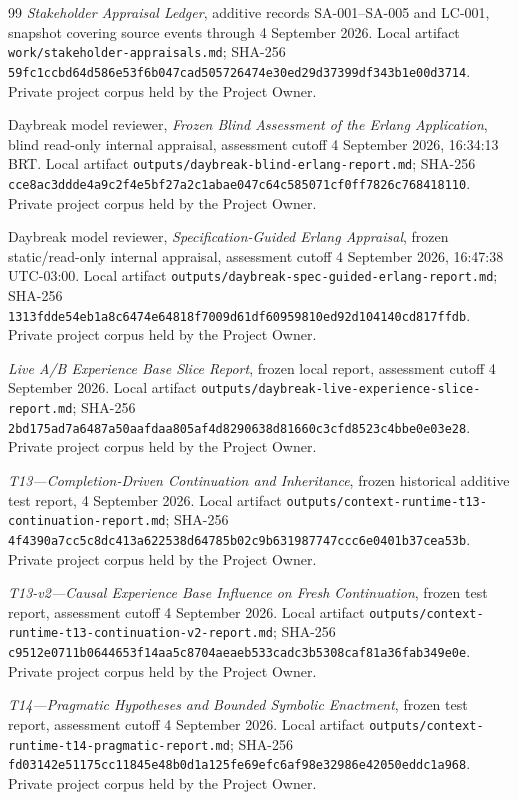 \documentclass[10pt,a4paper]{article}
\begin{document}
\begin{thebibliography}{99}
\emph{Stakeholder Appraisal Ledger}, additive records SA-001--SA-005 and LC-001, snapshot covering source events through 4 September 2026. Local artifact \nolinkurl{work/stakeholder-appraisals.md}; SHA-256 \nolinkurl{59fc1ccbd64d586e53f6b047cad505726474e30ed29d37399df343b1e00d3714}. Private project corpus held by the Project Owner.

Daybreak model reviewer, \emph{Frozen Blind Assessment of the Erlang Application}, blind read-only internal appraisal, assessment cutoff 4 September 2026, 16:34:13 BRT. Local artifact \nolinkurl{outputs/daybreak-blind-erlang-report.md}; SHA-256 \nolinkurl{cce8ac3ddde4a9c2f4e5bf27a2c1abae047c64c585071cf0ff7826c768418110}. Private project corpus held by the Project Owner.

Daybreak model reviewer, \emph{Specification-Guided Erlang Appraisal}, frozen static/read-only internal appraisal, assessment cutoff 4 September 2026, 16:47:38 UTC-03:00. Local artifact \nolinkurl{outputs/daybreak-spec-guided-erlang-report.md}; SHA-256 \nolinkurl{1313fdde54eb1a8c6474e64818f7009d61df60959810ed92d104140cd817ffdb}. Private project corpus held by the Project Owner.

\emph{Live A/B Experience Base Slice Report}, frozen local report, assessment cutoff 4 September 2026. Local artifact \nolinkurl{outputs/daybreak-live-experience-slice-report.md}; SHA-256 \nolinkurl{2bd175ad7a6487a50aafdaa805af4d8290638d81660c3cfd8523c4bbe0e03e28}. Private project corpus held by the Project Owner.

\emph{T13---Completion-Driven Continuation and Inheritance}, frozen historical additive test report, 4 September 2026. Local artifact \nolinkurl{outputs/context-runtime-t13-continuation-report.md}; SHA-256 \nolinkurl{4f4390a7cc5c8dc413a622538d64785b02c9b631987747ccc6e0401b37cea53b}. Private project corpus held by the Project Owner.

\emph{T13-v2---Causal Experience Base Influence on Fresh Continuation}, frozen test report, assessment cutoff 4 September 2026. Local artifact \nolinkurl{outputs/context-runtime-t13-continuation-v2-report.md}; SHA-256 \nolinkurl{c9512e0711b0644653f14aa5c8704aeaeb533cadc3b5308caf81a36fab349e0e}. Private project corpus held by the Project Owner.

\emph{T14---Pragmatic Hypotheses and Bounded Symbolic Enactment}, frozen test report, assessment cutoff 4 September 2026. Local artifact \nolinkurl{outputs/context-runtime-t14-pragmatic-report.md}; SHA-256 \nolinkurl{fd03142e51175cc11845e48b0d1a125fe69efc6af98e32986e42050eddc1a968}. Private project corpus held by the Project Owner.


\end{thebibliography}
\end{document}
